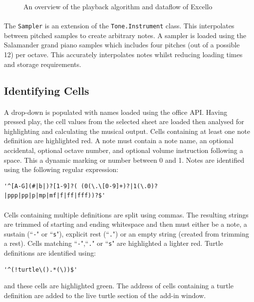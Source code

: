 \begin{figure}[htb]
\begin{center}

\end{center}
\caption{An overview of the playback algorithm and dataflow of Excello\label{fig:overview}}
\end{figure}

\paragraph{} The \texttt{Sampler} is an extension of the \texttt{Tone.Instrument} class. This interpolates between pitched samples to create arbitrary notes. A sampler is loaded using the Salamander grand piano samples which includes four pitches (out of a possible 12) per octave. This accurately interpolates notes whilst reducing loading times and storage requirements.

\subsection{Identifying Cells}

\paragraph{} A drop-down is populated with names loaded using the office API. Having pressed play, the cell values from the selected sheet are loaded then analysed for highlighting and calculating the musical output. Cells containing at least one note definition are highlighted red. A note must contain a note name, an optional accidental, optional octave number, and optional volume instruction following a space. This a dynamic marking or number between 0 and 1. Notes are identified using the following regular expression:

\begin{verbatim}
'^[A-G](#|b|)?[1-9]?( (0(\.\[0-9]+)?|1(\.0)?|ppp|pp|p|mp|mf|f|ff|fff))?$'
\end{verbatim}

\paragraph{} Cells containing multiple definitions are split using commas. The resulting strings are trimmed of starting and ending whitespace and then must either be a note, a sustain (``\texttt{-}" or ``\texttt{s}"), explicit rest (``\texttt{.}") or an empty string (created from trimming a rest). Cells matching ``\texttt{-}",``\texttt{.}" or ``\texttt{s}" are highlighted a lighter red. Turtle definitions are identified using:
\begin{verbatim}
'^(!turtle\().*(\))$'
\end{verbatim}
and these cells are highlighted green. The address of cells containing a turtle definition are added to the live turtle section of the add-in window.

